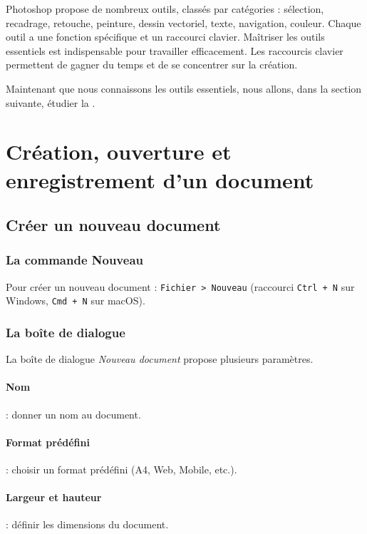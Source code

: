 Photoshop propose de nombreux outils, classés par catégories : sélection, recadrage, retouche, peinture, dessin vectoriel, texte, navigation, couleur. Chaque outil a une fonction spécifique et un raccourci clavier. Maîtriser les outils essentiels est indispensable pour travailler efficacement. Les raccourcis clavier permettent de gagner du temps et de se concentrer sur la création.

Maintenant que nous connaissons les outils essentiels, nous allons, dans la section suivante, étudier la .

\section{Création, ouverture et enregistrement d'un document}

\subsection{Créer un nouveau document}

\subsubsection{La commande Nouveau}

Pour créer un nouveau document : \texttt{Fichier > Nouveau} (raccourci \texttt{Ctrl + N} sur Windows, \texttt{Cmd + N} sur macOS).

\subsubsection{La boîte de dialogue}

La boîte de dialogue \emph{Nouveau document} propose plusieurs paramètres.

\paragraph{Nom} : donner un nom au document.

\paragraph{Format prédéfini} : choisir un format prédéfini (A4, Web, Mobile, etc.).

\paragraph{Largeur et hauteur} : définir les dimensions du document.

